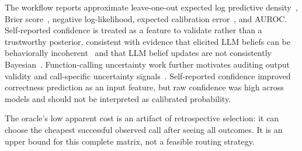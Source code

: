 \documentclass[11pt]{article}
\begin{document}
The workflow reports approximate leave-one-out expected log predictive density~\citep{vehtari2017practical}, Brier score~\citep{brier1950verification}, negative log-likelihood, expected calibration error~\citep{guo2017calibration}, and AUROC.
Self-reported confidence is treated as a feature to validate rather than a trustworthy posterior, consistent with evidence that elicited LLM beliefs can be behaviorally incoherent~\citep{yamin2026elicited} and that LLM belief updates are not consistently Bayesian~\citep{chen2026notbayesian}. Function-calling uncertainty work further motivates auditing output validity and call-specific uncertainty signals~\citep{ye2026functioncalling}.
Self-reported confidence improved correctness prediction as an input feature, but raw confidence was high across models and should not be interpreted as calibrated probability.

The oracle's low apparent cost is an artifact of retrospective selection: it can choose the cheapest successful observed call after seeing all outcomes. It is an upper bound for this complete matrix, not a feasible routing strategy. 








\end{document}
